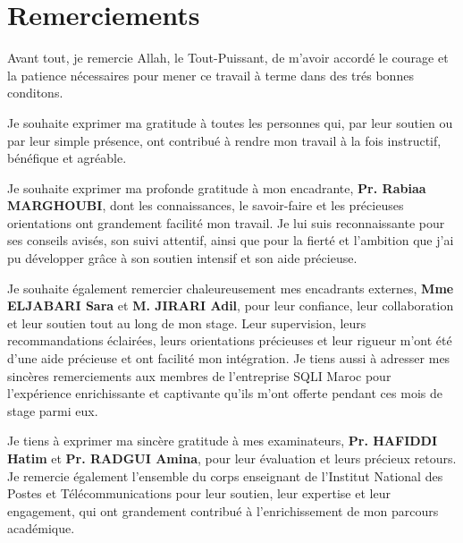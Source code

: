 \chapter*{Remerciements}



Avant tout, je remercie Allah, le Tout-Puissant, de m'avoir accordé le courage et la patience nécessaires pour mener ce travail à terme dans des trés bonnes conditons.

\vspace{10pt}
Je souhaite exprimer ma gratitude à toutes les personnes qui, par leur soutien ou par leur simple présence, ont contribué à rendre mon travail à la fois instructif, bénéfique et agréable.

\vspace{10pt}
Je souhaite exprimer ma profonde gratitude à mon encadrante, \textbf{Pr. Rabiaa MARGHOUBI}, dont les connaissances, le savoir-faire et les précieuses orientations ont grandement facilité mon travail. Je lui suis reconnaissante pour ses conseils avisés, son suivi attentif, ainsi que pour la fierté et l'ambition que j'ai pu développer grâce à son soutien intensif et son aide précieuse.

\vspace{10pt}
Je souhaite également remercier chaleureusement mes encadrants externes, \textbf{Mme ELJABARI Sara} et \textbf{M. JIRARI Adil}, pour leur confiance, leur collaboration et leur soutien tout au long de mon stage. Leur supervision, leurs recommandations éclairées, leurs orientations précieuses et leur rigueur m'ont été d'une aide précieuse et ont facilité mon intégration. Je tiens aussi à adresser mes sincères remerciements aux membres de l'entreprise SQLI Maroc pour l'expérience enrichissante et captivante qu'ils m'ont offerte pendant ces mois de stage parmi eux.

\vspace{10pt}
Je tiens à exprimer ma sincère gratitude à mes examinateurs, \textbf{Pr. HAFIDDI Hatim} et \textbf{Pr. RADGUI Amina}, pour leur évaluation et leurs précieux retours. Je remercie également l'ensemble du corps enseignant de l’Institut National des Postes et Télécommunications pour leur soutien, leur expertise et leur engagement, qui ont grandement contribué à l’enrichissement de mon parcours académique.